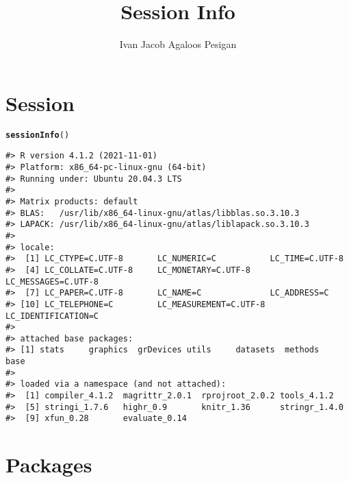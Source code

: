 \documentclass{article}\usepackage[]{graphicx}\usepackage{xcolor}
\title{Session Info}
\author{Ivan Jacob Agaloos Pesigan}
\date{}
\makeatletter
\newcommand{\hlstd}[1]{\textcolor[rgb]{0.345,0.345,0.345}{#1}}%
\newcommand{\hlkwd}[1]{\textcolor[rgb]{0.737,0.353,0.396}{\textbf{#1}}}%
\newenvironment{kframe}{%
 \def\at@end@of@kframe{}%
 \ifinner\ifhmode%
  \def\at@end@of@kframe{\end{minipage}}%
  \begin{minipage}{\columnwidth}%
 \fi\fi%
 \def\FrameCommand##1{\hskip\@totalleftmargin \hskip-\fboxsep
 \colorbox{shadecolor}{##1}\hskip-\fboxsep
     \hskip-\linewidth \hskip-\@totalleftmargin \hskip\columnwidth}%
 \MakeFramed {\advance\hsize-\width
   \@totalleftmargin\z@ \linewidth\hsize
   \@setminipage}}%
 {\par\unskip\endMakeFramed%
 \at@end@of@kframe}
\newenvironment{knitrout}{}{} %
\makeatother
\begin{document}
\maketitle







\section*{Session}

\begin{knitrout}
\color{fgcolor}\begin{kframe}
\begin{alltt}
\hlkwd{sessionInfo}\hlstd{()}
\end{alltt}
\begin{verbatim}
#> R version 4.1.2 (2021-11-01)
#> Platform: x86_64-pc-linux-gnu (64-bit)
#> Running under: Ubuntu 20.04.3 LTS
#> 
#> Matrix products: default
#> BLAS:   /usr/lib/x86_64-linux-gnu/atlas/libblas.so.3.10.3
#> LAPACK: /usr/lib/x86_64-linux-gnu/atlas/liblapack.so.3.10.3
#> 
#> locale:
#>  [1] LC_CTYPE=C.UTF-8       LC_NUMERIC=C           LC_TIME=C.UTF-8       
#>  [4] LC_COLLATE=C.UTF-8     LC_MONETARY=C.UTF-8    LC_MESSAGES=C.UTF-8   
#>  [7] LC_PAPER=C.UTF-8       LC_NAME=C              LC_ADDRESS=C          
#> [10] LC_TELEPHONE=C         LC_MEASUREMENT=C.UTF-8 LC_IDENTIFICATION=C   
#> 
#> attached base packages:
#> [1] stats     graphics  grDevices utils     datasets  methods   base     
#> 
#> loaded via a namespace (and not attached):
#>  [1] compiler_4.1.2  magrittr_2.0.1  rprojroot_2.0.2 tools_4.1.2    
#>  [5] stringi_1.7.6   highr_0.9       knitr_1.36      stringr_1.4.0  
#>  [9] xfun_0.28       evaluate_0.14
\end{verbatim}
\end{kframe}
\end{knitrout}

\section*{Packages}
\end{document}
